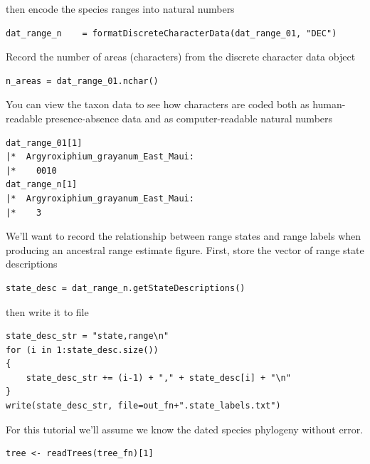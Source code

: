 then encode the species ranges into natural numbers

\begin{snugshade}
\begin{lstlisting}
dat_range_n    = formatDiscreteCharacterData(dat_range_01, "DEC")
\end{lstlisting}
\end{snugshade}


Record the number of areas (characters) from the discrete character data object

\begin{snugshade}
\begin{lstlisting}
n_areas = dat_range_01.nchar()
\end{lstlisting}
\end{snugshade}

You can view the taxon data to see how characters are coded both as human-readable presence-absence data and as computer-readable natural numbers
\begin{snugshade}
\begin{lstlisting}
dat_range_01[1]
|*  Argyroxiphium_grayanum_East_Maui:
|*    0010
dat_range_n[1]
|*  Argyroxiphium_grayanum_East_Maui:
|*    3
\end{lstlisting}
\end{snugshade}


We'll want to record the relationship between range states and range labels when producing an ancestral range estimate figure.
First, store the vector of range state descriptions

\begin{snugshade}
\begin{lstlisting}
state_desc = dat_range_n.getStateDescriptions()
\end{lstlisting}
\end{snugshade}

then write it to file 

\begin{snugshade}
\begin{lstlisting}
state_desc_str = "state,range\n"
for (i in 1:state_desc.size())
{
    state_desc_str += (i-1) + "," + state_desc[i] + "\n"
}
write(state_desc_str, file=out_fn+".state_labels.txt")
\end{lstlisting}
\end{snugshade}

For this tutorial we'll assume we know the dated species phylogeny without error.

\begin{snugshade}
\begin{lstlisting}
tree <- readTrees(tree_fn)[1]
\end{lstlisting}
\end{snugshade}

